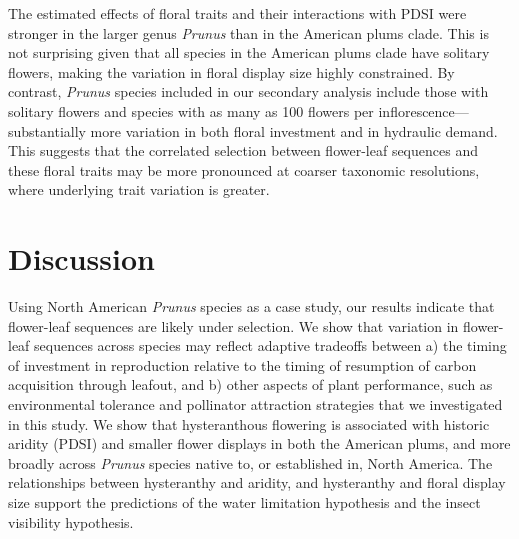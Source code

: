 \documentclass{article}[12pt]
\begin{document}
{{The estimated effects of floral traits and their interactions with PDSI were stronger in the larger genus \emph{Prunus} than in the American plums clade. This is not surprising given that all species in the American plums clade have solitary flowers, making the variation in floral display size highly constrained. By contrast, \emph{Prunus} species included in our secondary analysis include those with  solitary flowers and species with as many as 100 flowers per inflorescence---substantially more variation in both floral investment and in hydraulic demand. This suggests that the correlated selection between flower-leaf sequences and these floral traits may be more pronounced at coarser taxonomic resolutions, where underlying trait variation is greater.


\section*{Discussion}
Using North American \textit{Prunus} species as a case study, our results indicate that flower-leaf sequences are likely under selection. We show that variation in flower-leaf sequences across species may reflect adaptive tradeoffs between a) the timing of investment in reproduction relative to the timing of resumption of carbon acquisition through leafout, and b) other aspects of plant performance, such as environmental tolerance and pollinator attraction strategies that we investigated in this study. We show that hysteranthous flowering is associated with historic aridity (PDSI) and smaller flower displays in both the American plums, and more broadly across \emph{Prunus} species native to, or established in, North America. The relationships between hysteranthy and aridity, and hysteranthy and floral display size support the predictions of the water limitation hypothesis and the insect visibility hypothesis. 

}}
\end{document}
